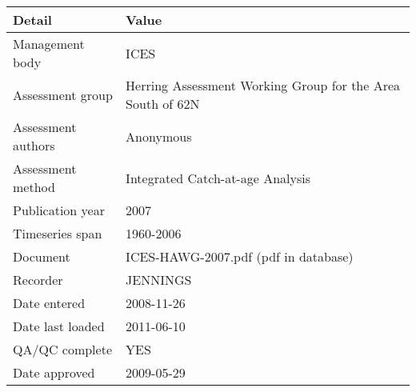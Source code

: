 \begin{table}[htb]
\centering
\begin{tabular}{lp{7cm}}
\toprule
Detail & Value \\
\midrule
Management body    & ICES                                                       \\
Assessment group   & Herring Assessment Working Group for the Area South of 62N \\
Assessment authors & Anonymous                                                  \\
Assessment method  & Integrated Catch-at-age Analysis                           \\
Publication year   & 2007                                                       \\
Timeseries span    & 1960-2006                                                  \\
Document           & ICES-HAWG-2007.pdf (pdf in database)                       \\
Recorder           & JENNINGS                                                   \\
Date entered       & 2008-11-26                                                 \\
Date last loaded   & 2011-06-10                                                 \\
QA/QC complete     & YES                                                        \\
Date approved      & 2009-05-29                                                 \\
\bottomrule
\end{tabular}
\label{tab:assessdet}
\end{table}
